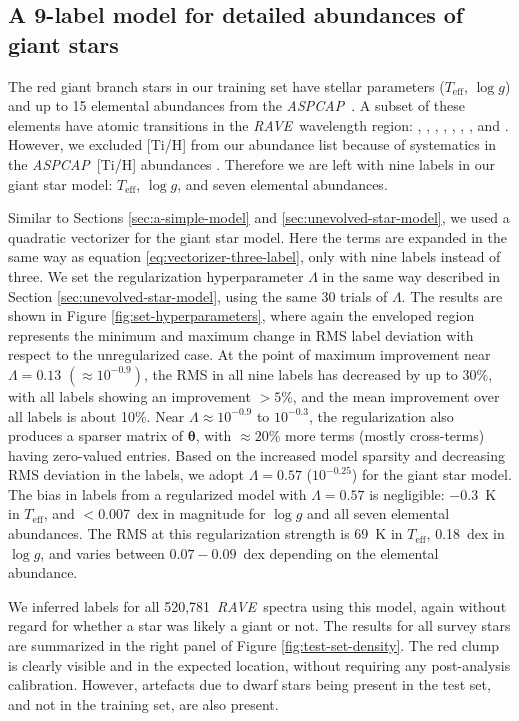 \documentclass[preprint]{aastex}
\newcommand{\acronym}[1]{{\small{#1}}}
\newcommand{\project}[1]{\textsl{#1}}
\newcommand{\rave}{\project{\acronym{RAVE}}}
\newcommand{\aspcap}{\project{\acronym{ASPCAP}}}
\newcommand{\teff}{T_{\mathrm{eff}}}
\newcommand{\logg}{\log g}
\newcommand{\Nspectra}{520,781}
\newcommand{\Dvector}[1]{\boldsymbol{#1}}
\newcommand{\vectheta}{\Dvector{\theta}}
\begin{document}
\subsection{A 9-label model for detailed abundances of giant stars}
\label{sec:evolved-star-model}


The red giant branch stars in our training set have stellar parameters 
($\teff$, $\logg$) and up to 15 elemental abundances from the \aspcap\ 
\citep{Garcia_Perez_2016}.  A subset of these elements have atomic transitions in the 
\rave\ wavelength region: \ion{O}{1}, \ion{Mg}{1}, \ion{Al}{1}, \ion{Si}{1}, 
\ion{Ca}{2}, \ion{Ti}{1}, \ion{Fe}{1}, and \ion{Ni}{1}.  However, we 
excluded [Ti/H] from our abundance list because of systematics in the \aspcap\
[Ti/H] abundances \citep{Holtzman_2015,Hawkins_2016}.  Therefore we are left 
with nine labels in our giant star model: $\teff$, $\logg$, and seven elemental 
abundances.  


Similar to Sections \ref{sec:a-simple-model} and \ref{sec:unevolved-star-model},
we used a quadratic vectorizer for the giant star model.  Here the terms are 
expanded in the same way as equation \ref{eq:vectorizer-three-label}, only
with nine labels instead of three.  We set the regularization hyperparameter $\Lambda$
in the same way described in Section \ref{sec:unevolved-star-model}, using the same 30 trials of $\Lambda$.
The results are shown in Figure \ref{fig:set-hyperparameters}, where
again the enveloped region represents the minimum and maximum change in RMS label
deviation with respect to the unregularized case.  At the point of maximum improvement 
near $\Lambda = 0.13$ $(\approx10^{-0.9})$, the RMS in all nine labels has decreased by up to $30$\%,
with all labels showing an improvement $>5$\%, and the mean improvement over all labels is about 10\%.
Near $\Lambda \approx 10^{-0.9}$ to $10^{-0.3}$, the regularization also produces a sparser matrix
of $\vectheta$, with $\approx20$\% more terms (mostly cross-terms) having zero-valued entries.
Based on the increased model sparsity and decreasing RMS deviation in the labels, 
we adopt $\Lambda = 0.57$ ($10^{-0.25}$) for the giant star model.  The bias in 
labels from a regularized model with $\Lambda = 0.57$ is negligible: $-0.3$~K in 
$\teff$, and $<$0.007~dex in magnitude for $\logg$ and all seven elemental
abundances.  The RMS at this regularization strength is 69~K in $\teff$, 0.18~dex 
in $\logg$, and varies between $0.07-0.09$~dex depending on the elemental abundance.  


We inferred labels for all \Nspectra\ \rave\ spectra using this model, again without
regard for whether a star was likely a giant or not.  The results for all survey stars
are summarized in the right panel of Figure \ref{fig:test-set-density}.  The red clump
is clearly visible and in the expected location, without requiring any post-analysis 
calibration.  However, artefacts due to dwarf stars being present in the test set,
and not in the training set, are also present.
\end{document}
